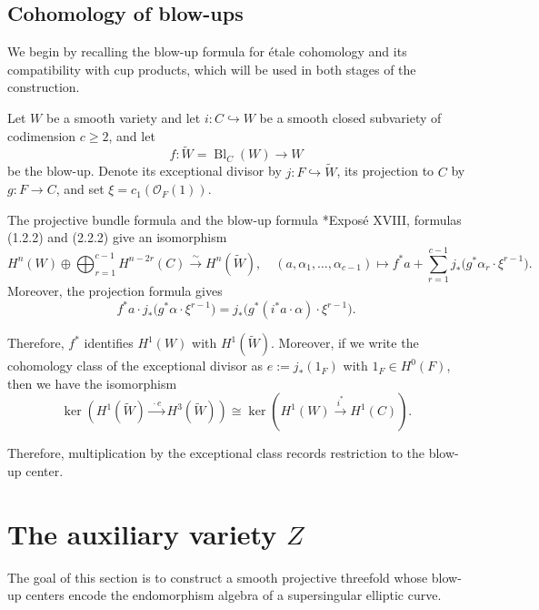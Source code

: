 \documentclass[11pt, reqno]{amsart}
\theoremstyle{definition}
\newcommand\OO{\mathcal{O}}
\DeclareMathOperator{\Bl}{Bl}
\begin{document}
\subsection{Cohomology of blow-ups}
\label{subsec:cohomology-of-blowups}\;

We begin by recalling the blow-up formula for \'etale cohomology and its
compatibility with cup products, which will be used in both stages of the
construction.

Let $W$ be a smooth variety and let $i:C\hookrightarrow W$ be a smooth closed subvariety of codimension
$c\geq 2$, and let
\[
f:\widetilde W=\Bl_C(W)\longrightarrow W
\]
be the blow-up.  Denote its exceptional divisor by $j:F\hookrightarrow
\widetilde W$, its projection to $C$ by $g:F\to C$, and set
$\xi=c_1(\OO_F(1))$.

The projective bundle formula and the blow-up formula
\cite{SGA7-II}*{Expos\'e XVIII, formulas (1.2.2) and (2.2.2)}
give an isomorphism
\begin{equation}
    \label{eqn: blowup for}
    H^n(W)\oplus\bigoplus_{r=1}^{c-1}H^{n-2r}(C)
\xrightarrow{\sim} H^n(\widetilde W),
\quad 
(a,\alpha_1,\ldots,\alpha_{c-1})
\mapsto
f^*a+\sum_{r=1}^{c-1}
j_*\bigl(g^*\alpha_r\cdot\xi^{r-1}\bigr).
\end{equation}
Moreover, the projection formula gives
\[
f^*a\cdot j_*\bigl(g^*\alpha\cdot\xi^{r-1}\bigr)
=
j_*\bigl(g^*(i^*a\cdot\alpha)\cdot\xi^{r-1}\bigr).
\]


Therefore, $f^*$ identifies $H^1(W)$ with $H^1(\widetilde W)$. Moreover,
if we write the cohomology class of the exceptional divisor as $e:=j_*(1_F)$ with  $1_F\in H^0(F)$, then we have the isomorphism
\begin{equation}
\label{eqn: proj formula}
    \ker\left(
H^1(\widetilde W)\xrightarrow{\ \cdot e\ }H^3(\widetilde W)
\right)
\cong 
\ker\left(
H^1(W)\xrightarrow{\ i^*\ }H^1(C)
\right).
\end{equation}

Therefore, multiplication by the exceptional class records restriction to the
blow-up center.



\section{The auxiliary variety $Z$}
\label{subsec:auxiliary-variety}

The goal of this section is to construct a smooth projective threefold whose blow-up centers
encode the endomorphism algebra of a supersingular elliptic curve.
\end{document}
